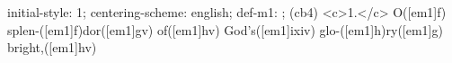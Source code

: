 initial-style: 1;
centering-scheme: english;
def-m1: \grealign;
(cb4) <c>1.</c> O([em1]f) splen-([em1]f)dor([em1]gv) of([em1]hv) God's([em1]ixiv) glo-([em1]h)ry([em1]g) bright,([em1]hv)